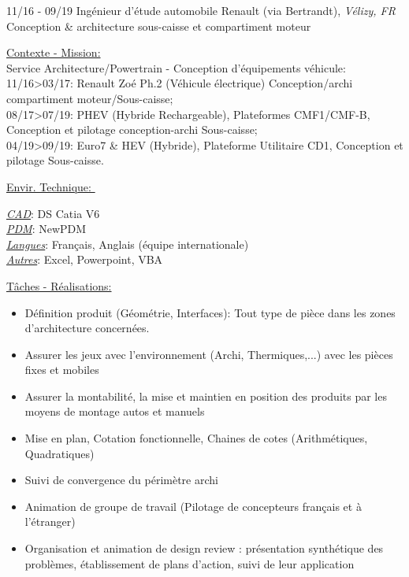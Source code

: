 \documentclass[]{friggeri-cv}
\begin{document}
\begin{entrylist}
  \entry
    {11/16 - 09/19}
    {Ingénieur d'étude automobile}
    {Renault (via Bertrandt), \textit{Vélizy, FR}}
    {Conception \& architecture sous-caisse et compartiment moteur}
\end{entrylist}
\vspace{-10pt}
\begin{minipage}[t]{0.65\linewidth}
\underline{Contexte - Mission: }\\
Service Architecture/Powertrain - Conception d'équipements véhicule:\\11/16>03/17: Renault Zoé Ph.2 (Véhicule électrique) Conception/archi compartiment moteur/Sous-caisse;\\08/17>07/19: PHEV (Hybride Rechargeable), Plateformes CMF1/CMF-B, Conception et pilotage conception-archi Sous-caisse;\\04/19>09/19: Euro7 \& HEV (Hybride), Plateforme Utilitaire CD1, Conception et pilotage Sous-caisse.\\
\end{minipage} %
\begin{minipage}[t]{0.38\textwidth}
    \underline{Envir. Technique: }\
    \vspace{1mm}
    
\underline{\textit{CAD}}: DS Catia V6\\
\underline{\textit{PDM}}: NewPDM\\
\underline{\textit{Langues}}: Français, Anglais (équipe internationale)\\
\underline{\textit{Autres}}: Excel, Powerpoint, VBA
\vspace{25mm}
    \end{minipage}
\vspace{1.5mm}
\underline{Tâches - Réalisations: }\\

\begin{itemize}
\setlength{\itemsep}{1pt}
\setlength{\parskip}{0pt}
\setlength{\parsep}{0pt}

\item Définition produit (Géométrie, Interfaces): Tout type de pièce dans les zones d'architecture concernées.
\item Assurer les jeux avec l'environnement (Archi, Thermiques,...) avec les pièces fixes et mobiles
\item Assurer la montabilité, la mise et maintien en position des produits par les moyens de montage autos et manuels
\item Mise en plan, Cotation fonctionnelle, Chaines de cotes (Arithmétiques, Quadratiques)
\item Suivi de convergence du périmètre archi
\item Animation de groupe de travail (Pilotage de concepteurs français et à l'étranger)
\item Organisation et animation de design review : présentation synthétique des problèmes, établissement de plans d’action, suivi de leur application
\end{itemize}
\end{document}
